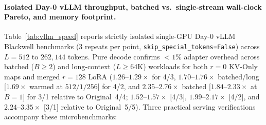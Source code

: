 \documentclass[11pt]{article}
\begin{document}
\paragraph{Isolated Day-0 vLLM throughput, batched vs.\ single-stream wall-clock Pareto, and memory footprint.}
Table~\ref{tab:vllm_speed} reports strictly isolated single-GPU Day-0 vLLM Blackwell benchmarks (3 repeats per point,
\texttt{skip\_special\_tokens=False}) across $L{=}512$ to $262{,}144$ tokens. Pure decode confirms $<1\%$ adapter overhead
across batched ($B{\ge}2$) and long-context ($L{\ge}64\text{K}$) workloads for both $r{=}0$ KV-Only maps and merged $r{=}128$
LoRA ($1.26$--$1.29\times$ for 4/3, $1.70$--$1.76\times$ batched/long [$1.69\times$ warmed at $512/1/256$] for 4/2, and
$2.35$--$2.76\times$ batched [$1.84$--$2.33\times$ at $B{=}1$] for 3/1 relative to Original~4/4; $1.52$--$1.57\times$
[4/3], $1.99$--$2.17\times$ [4/2], and $2.24$--$3.35\times$ [3/1] relative to Original~5/5). Three
practical serving verifications accompany these microbenchmarks:
\end{document}
